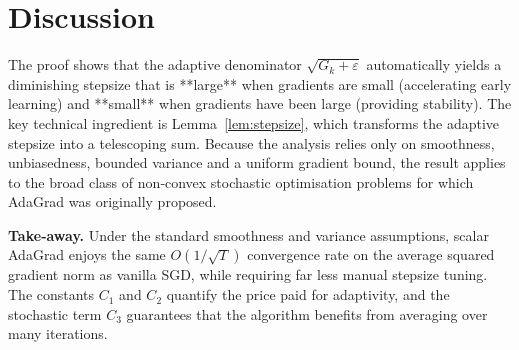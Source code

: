 \documentclass{article}
\begin{document}
\section*{Discussion}

The proof shows that the adaptive denominator $\sqrt{G_k+\varepsilon}$ automatically yields a diminishing stepsize that is **large** when gradients are small (accelerating early learning) and **small** when gradients have been large (providing stability).  The key technical ingredient is Lemma~\ref{lem:stepsize}, which transforms the adaptive stepsize into a telescoping sum.  Because the analysis relies only on smoothness, unbiasedness, bounded variance and a uniform gradient bound, the result applies to the broad class of non‑convex stochastic optimisation problems for which AdaGrad was originally proposed.

\bigskip
\noindent\textbf{Take‑away.}  Under the standard smoothness and variance assumptions, scalar AdaGrad enjoys the same $O(1/\sqrt{T})$ convergence rate on the average squared gradient norm as vanilla SGD, while requiring far less manual stepsize tuning.  The constants $C_1$ and $C_2$ quantify the price paid for adaptivity, and the stochastic term $C_3$ guarantees that the algorithm benefits from averaging over many iterations.
\end{document}
